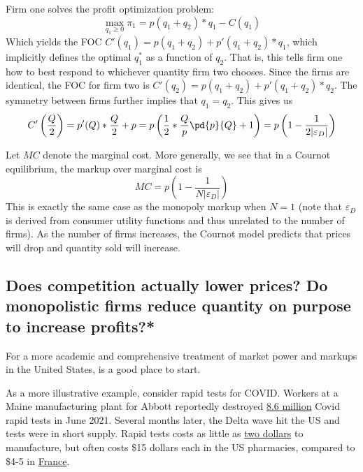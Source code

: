 Firm one solves the profit optimization problem:
\begin{equation}
    \max_{q_1 \geq 0 } \pi_1 = p(q_1 + q_2)*q_1 - C(q_1)
\end{equation}
Which yields the FOC $C'(q_1) = p(q_1 + q_2)+p'(q_1 + q_2)*q_1$, which implicitly defines the optimal $q_1^*$ as a function of $q_2$. That is, this tells firm one how to best respond to whichever quantity firm two chooses. Since the firms are identical, the FOC for firm two is $C'(q_2) = p(q_1 + q_2)+p'(q_1 + q_2)*q_2$. The symmetry between firms further implies that $q_1 = q_2$. This gives us 
\begin{equation}
    C'\left(\frac{Q}{2}\right) = p'(Q)*\frac{Q}{2} + p = p\left(\frac{1}{2}*\frac{Q}{p} \pd{p}{Q} + 1\right) = p\left(1 - \frac{1}{2|\varepsilon_D|}\right)
\end{equation}

Let $MC$ denote the marginal cost. More generally, we see that in a Cournot equilibrium, the markup over marginal cost is 
\begin{equation*}
    MC = p\left(1 - \frac{1}{N|\varepsilon_D|} \right)
\end{equation*}
This is exactly the same case as the monopoly markup when $N = 1$ (note that $\varepsilon_D$ is derived from consumer utility functions and thus unrelated to the number of firms). As the number of firms increases, the Cournot model predicts that prices will drop and quantity sold will increase. 

\subsection*{Does competition actually lower prices? Do monopolistic firms reduce quantity on purpose to increase profits?*}

For a more academic and comprehensive treatment of market power and markups in the United States, \citet{marketpower} is a good place to start. 

As a more illustrative example, consider rapid tests for COVID. Workers at a Maine manufacturing plant for Abbott reportedly destroyed \href{https://www.nytimes.com/2021/08/20/us/abbott-covid-tests.html}{8.6 million} Covid rapid tests in June 2021. Several months later, the Delta wave hit the US and tests were in short supply. Rapid tests costs as little as \href{https://www.reuters.com/business/healthcare-pharmaceuticals/rapid-covid-19-tests-increasingly-scarce-pricey-demand-employers-jumps-2021-10-05/}{two dollars} to manufacture, but often costs \$15 dollars each in the US pharmacies, compared to \$4-5 in \href{https://www.theguardian.com/world/2022/feb/11/how-much-does-a-covid-test-cost-around-the-world}{France}. 

